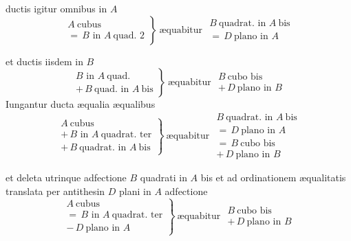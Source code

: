 \documentclass[11pt,a4paper]{article}
\begin{document}
ductis igitur omnibus in $A$
\[ \left.\begin{array}{l} A\ \text{cubus} \\ =\,B \text{ in } A\ \text{quad. } 2 \end{array}\right\}\ \text{æquabitur } \begin{array}{l} B\ \text{quadrat. in } A\ \text{bis} \\ =\,D\ \text{plano in } A \end{array} \]
\marginal{$\pm$ ; $\pm$}

et ductis iisdem in $B$
\[ \left.\begin{array}{l} B \text{ in } A\ \text{quad.} \\ +\,B\ \text{quad. in } A\ \text{bis} \end{array}\right\}\ \text{æquabitur } \begin{array}{l} B\ \text{cubo bis} \\ +\,D\ \text{plano in } B \end{array} \]
Iungantur ducta æqualia æqualibus
\[ \left.\begin{array}{l} A\ \text{cubus} \\ +\,B \text{ in } A\ \text{quadrat. ter} \\ +\,B\ \text{quadrat. in } A\ \text{bis} \end{array}\right\}\ \text{æquabitur } \begin{array}{l} B\ \text{quadrat. in } A\ \text{bis} \\ =\,D\ \text{plano in } A \\ =\,B\ \text{cubo bis} \\ +\,D\ \text{plano in } B \end{array} \]
\marginal{$\pm$ ; $\pm$}

et deleta utrinque adfectione $B$ quadrati in $A$ bis et ad ordinationem æqualitatis translata per antithesin $D$ plani in $A$ adfectione
\[ \left.\begin{array}{l} A\ \text{cubus} \\ =\,B \text{ in } A\ \text{quadrat. ter} \\ -\,D\ \text{plano in } A \end{array}\right\}\ \text{æquabitur } \begin{array}{l} B\ \text{cubo bis} \\ +\,D\ \text{plano in } B \end{array} \]
\marginal{$+$}
\end{document}

